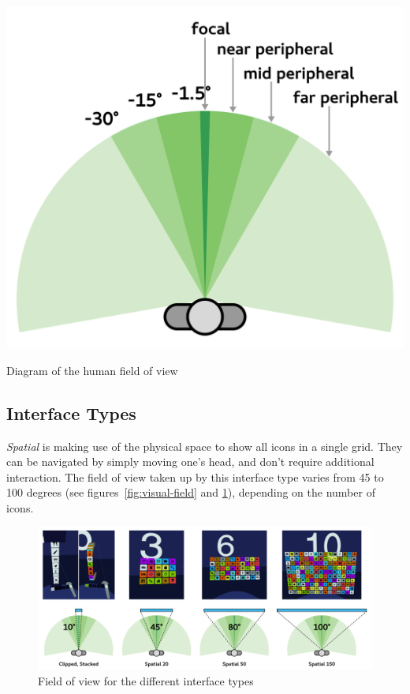 \documentclass[nobib]{tufte-book} %
\begin{document}
\begin{marginfigure}
  \includegraphics[width=\linewidth]{visual-field.png}
  \caption{Diagram of the human field of view}
  \label{fig:visual-field}
\end{marginfigure}

\subsection{Interface Types}
\emph{Spatial} is making use of the physical space to show all icons in a single grid. They can be navigated by simply moving one's head, and don't require additional interaction. The field of view taken up by this interface type varies from 45 to 100 degrees (see figures~\ref{fig:visual-field} and \ref{fig:fov-types}), depending on the number of icons.

\begin{figure}[h]
  \includegraphics[width=\linewidth]{fov-types.png}
  \caption{Field of view for the different interface types}
  \label{fig:fov-types}
\end{figure}
\end{document}
